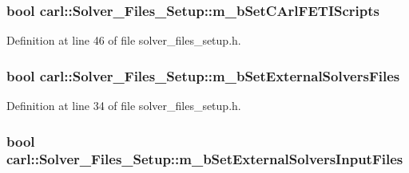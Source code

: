\subsubsection[{m\+\_\+b\+Set\+C\+Arl\+F\+E\+T\+I\+Scripts}]{\setlength{\rightskip}{0pt plus 5cm}bool carl\+::\+Solver\+\_\+\+Files\+\_\+\+Setup\+::m\+\_\+b\+Set\+C\+Arl\+F\+E\+T\+I\+Scripts\hspace{0.3cm}{\ttfamily [protected]}}\label{classcarl_1_1_solver___files___setup_a53cf1256ea7a5f375a887d91ddd2ec9a}


Definition at line 46 of file solver\+\_\+files\+\_\+setup.\+h.

\hypertarget{classcarl_1_1_solver___files___setup_ad93c68f661273a66d319906dbfe080b5}{}
\subsubsection[{m\+\_\+b\+Set\+External\+Solvers\+Files}]{\setlength{\rightskip}{0pt plus 5cm}bool carl\+::\+Solver\+\_\+\+Files\+\_\+\+Setup\+::m\+\_\+b\+Set\+External\+Solvers\+Files\hspace{0.3cm}{\ttfamily [protected]}}\label{classcarl_1_1_solver___files___setup_ad93c68f661273a66d319906dbfe080b5}


Definition at line 34 of file solver\+\_\+files\+\_\+setup.\+h.

\hypertarget{classcarl_1_1_solver___files___setup_ae9334ddcfaace89ab70ea918190cfd08}{}
\subsubsection[{m\+\_\+b\+Set\+External\+Solvers\+Input\+Files}]{\setlength{\rightskip}{0pt plus 5cm}bool carl\+::\+Solver\+\_\+\+Files\+\_\+\+Setup\+::m\+\_\+b\+Set\+External\+Solvers\+Input\+Files\hspace{0.3cm}{\ttfamily [protected]}}\label{classcarl_1_1_solver___files___setup_ae9334ddcfaace89ab70ea918190cfd08}



